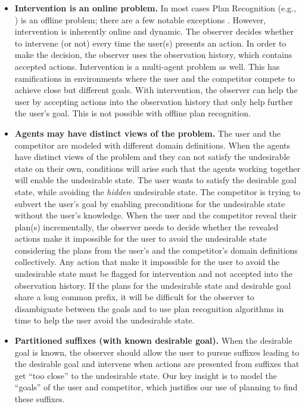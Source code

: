 \begin{itemize}
\item \textbf{Intervention is an online problem.}
In most cases Plan Recognition (e.g., \cite{ramirez2009plan,ramirez2010probabilistic, sohrabi2016plan}) is an offline problem;
there are a few notable exceptions \cite{mirsky2018}.
However, intervention is inherently online and dynamic.  
The observer decides whether to intervene (or not) every time the user(s) presents an action.
In order to make the decision, the observer uses the observation history, which contains accepted actions.
Intervention is a multi-agent problem as well. 
This has ramifications in environments where the user and the competitor compete to achieve close but different goals. 
With intervention, the observer can help the user by accepting actions into the observation history that only help further the user's goal. 
This is not possible with offline plan recognition.
\item \textbf{Agents may have distinct views of the problem.}  
The user and the competitor are modeled with different domain definitions. 
When the agents have distinct views of the problem and they can not satisfy the undesirable state on their own, conditions will arise such that the agents working together will enable the undesirable state.
The user wants to satisfy the desirable goal state, while avoiding the \textit{hidden} undesirable state.
The competitor is trying to subvert the user’s goal by enabling preconditions for the undesirable state without the user's knowledge.
When the user and the competitor reveal their plan(s) incrementally, the observer needs to decide whether the revealed actions make it impossible for the user to avoid the undesirable state considering the plans from the user's and the competitor's domain definitions collectively. 
Any action that make it impossible for the user to avoid the undesirable state must be flagged for intervention and not accepted into the observation history.
If the plans for the undesirable state and desirable goal share a long common prefix, 
it will be difficult for the observer to disambiguate between the goals and to use plan recognition algorithms in time to help the user avoid the undesirable state.
\item \textbf{Partitioned suffixes (with known desirable goal).}
When the desirable goal is known, the observer should allow the user to pursue suffixes leading to the desirable goal and intervene when actions are presented from suffixes that get ``too close'' to the undesirable state. 
Our key insight is to model the  ``goals'' of the user and competitor, which justifies our use of planning to find these suffixes. 

\end{itemize}
